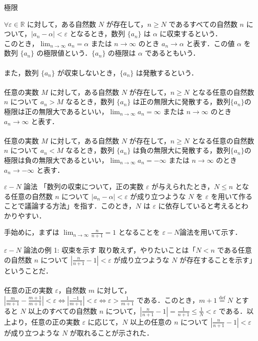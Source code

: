 \documentclass[a4paper]{ltjsarticle}
\begin{document}
  \begin{tcb}{極限}{}

   $\forall \varepsilon \in \mathbb{R}$ に対して，ある自然数 $N$ が存在して，$n \geq N$ であるすべての自然数 $n$ について，$|a_n - \alpha| < \varepsilon$ となるとき，数列 $\{a_n\}$ は $\alpha$ に収束するという．\\
   このとき，$\lim_{n \to \infty} a_n = \alpha$ または $n \to \infty$ のとき $a_n \to \alpha$ と表す．この値 $\alpha$ を数列 $\{a_n\}$ の極限値という．$\{a_n\}$ の極限は $\alpha$ であるともいう．\\
   \\
   また，数列 $\{a_n\}$ が収束しないとき，$\{a_n\}$ は発散するという．\\
   \\
   任意の実数 $M$ に対して，ある自然数 $N$ が存在して，$n \geq N$ となる任意の自然数 $n$ について $a_n > M$ なるとき，数列 $\{a_n\}$ は正の無限大に発散する，数列$\{a_n\}$の極限は正の無限大であるといい，$\lim_{n \to \infty} a_n = \infty$ または $n \to \infty$ のとき $a_n \to \infty$ と表す．\\
   \\
   任意の実数 $M$ に対して，ある自然数 $N$ が存在して，$n \geq N$ となる任意の自然数 $n$ について $a_n < M$ なるとき，数列 $\{a_n\}$ は負の無限大に発散する，数列$\{a_n\}$の極限は負の無限大であるといい，$\lim_{n \to \infty} a_n = -\infty$ または $n \to \infty$ のとき $a_n \to -\infty$ と表す．

  \end{tcb}

  \begin{tcb}{$\varepsilon - N$ 論法}{}
   「数列の収束について，正の実数 $\varepsilon$ が与えられたとき，$N \leq n$ となる任意の自然数 $n$ について $|a_n - \alpha| < \varepsilon$ が成り立つような $N$ を $\varepsilon$ を用いて作ることで議論する方法」を指す．このとき，$N$ は $\varepsilon$ に依存していると考えるとわかりやすい． 

  \end{tcb}
 手始めに，まずは $\lim_{n \to \infty} \frac{n}{n + 1} = 1$ となることを $\varepsilon - N $論法を用いて示す． 

  \begin{tcb}{$\varepsilon - N$ 論法の例 1: 収束を示す}{}
   取り敢えず，やりたいことは「$N < n$ である任意の自然数 $n$ について $|\frac{n}{n + 1} - 1| < \varepsilon$ が成り立つような $N$ が存在することを示す」ということだ．
   \\
   \\
   任意の正の実数 $\varepsilon$，自然数 $m$ に対して，$|\frac{m}{m + 1} - \frac{m + 1}{m + 1}| < \varepsilon \Leftrightarrow |\frac{-1}{m + 1}| < \varepsilon \Leftrightarrow  \varepsilon  > \frac{1}{m + 1}$ である．このとき，$m + 1 \stackrel{\mathrm{def}}{=} N$ とすると $N$ 以上のすべての自然数 $n$ について，$|\frac{n}{n + 1} - 1| = \frac{1}{n + 1} \leq \frac{1}{N} < \varepsilon$ である．以上より，任意の正の実数 $\varepsilon$ に応じて，$N$ 以上の任意の $n$ について $|\frac{n}{n + 1} - 1| < \varepsilon$ が成り立つような $N$ が取れることが示された．

  \end{tcb}
\end{document}
